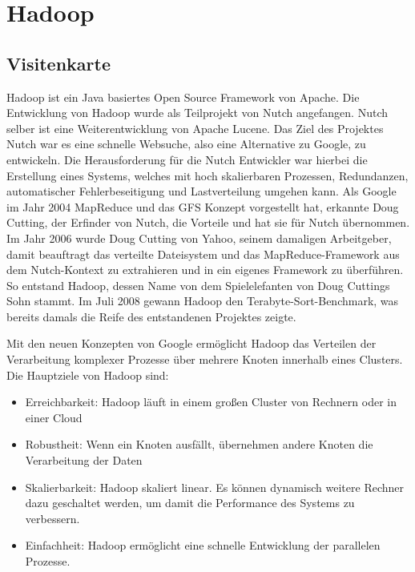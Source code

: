 \section{Hadoop}

\subsection{Visitenkarte}%
Hadoop ist ein Java basiertes Open Source Framework von Apache. 
Die Entwicklung von Hadoop wurde als Teilprojekt von Nutch angefangen. Nutch selber ist eine Weiterentwicklung von Apache Lucene. Das Ziel des Projektes Nutch war es eine schnelle Websuche, also eine Alternative zu Google, zu entwickeln. Die Herausforderung für die Nutch Entwickler war hierbei die Erstellung eines Systems, welches mit hoch skalierbaren Prozessen, Redundanzen, automatischer Fehlerbeseitigung und Lastverteilung umgehen kann. Als Google im Jahr 2004 MapReduce und das \ac{GFS} Konzept vorgestellt hat, erkannte Doug Cutting, der Erfinder von Nutch, die Vorteile und hat sie für Nutch übernommen. Im Jahr 2006 wurde Doug Cutting von Yahoo, seinem damaligen Arbeitgeber, damit beauftragt das verteilte Dateisystem und das MapReduce-Framework aus dem Nutch-Kontext zu extrahieren und in ein eigenes Framework zu überführen. So entstand Hadoop, dessen Name von dem Spielelefanten von Doug Cuttings Sohn stammt. Im Juli 2008 gewann Hadoop den Terabyte-Sort-Benchmark, was bereits damals die Reife des entstandenen Projektes zeigte. \cite[S. 24]{Wartal2012}

Mit den neuen Konzepten von Google ermöglicht Hadoop das Verteilen der Verarbeitung komplexer Prozesse über mehrere Knoten innerhalb eines Clusters.
Die Hauptziele von Hadoop sind:

\begin{itemize}
\item Erreichbarkeit: Hadoop läuft in einem großen Cluster von Rechnern oder in einer Cloud 
\item Robustheit: Wenn ein Knoten ausfällt, übernehmen andere Knoten die Verarbeitung der Daten
\item Skalierbarkeit: Hadoop skaliert linear. Es können dynamisch weitere Rechner dazu geschaltet werden, um damit die Performance des Systems zu verbessern.
\item Einfachheit: Hadoop ermöglicht eine schnelle Entwicklung der parallelen Prozesse.
\cite{HadoopInAction}
\end{itemize}


